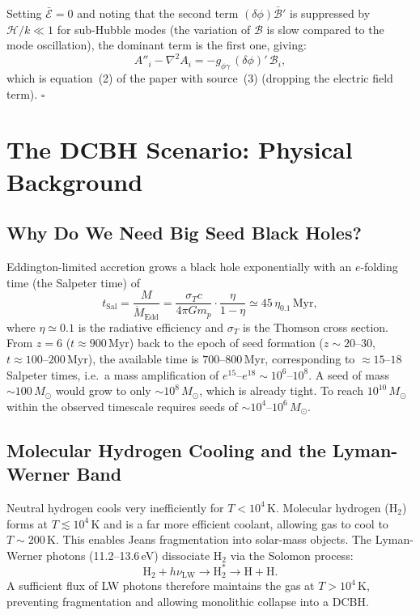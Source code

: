 \documentclass[12pt,a4paper]{report}
\newcommand{\gag}{g_{\phi\gamma}}
\newcommand{\LW}{\mathrm{LW}}
\theoremstyle{definition}
\begin{document}
Setting $\bar{\mathcal{E}}=0$ and noting that the second term
$(\delta\phi)\bar{\mathcal{B}}'$ is suppressed by $\mathcal{H}/k\ll 1$ for
sub-Hubble modes (the variation of $\mathcal{B}$ is slow compared to the mode
oscillation), the dominant term is the first one, giving:
\begin{equation}
  A''_i - \nabla^2 A_i = -\gag\,(\delta\phi)'\,\mathcal{B}_i,
  \label{eq:EOM_final}
\end{equation}
which is equation~(2) of the paper with source~(3) (dropping the electric field term). $\square$

\chapter{The DCBH Scenario: Physical Background}
\label{app:DCBH}

\section{Why Do We Need Big Seed Black Holes?}

Eddington-limited accretion grows a black hole exponentially with an $e$-folding time
(the Salpeter time) of
\begin{equation}
  t_{\mathrm{Sal}} = \frac{M}{\dot M_{\mathrm{Edd}}}
  = \frac{\sigma_T c}{4\pi G m_p}\cdot\frac{\eta}{1-\eta}
  \simeq 45\,\eta_{0.1}\,\mathrm{Myr},
\end{equation}
where $\eta\simeq 0.1$ is the radiative efficiency and $\sigma_T$ is the Thomson
cross section. From $z=6$ ($t\approx 900$\,Myr) back to the epoch of seed formation
($z\sim 20$--$30$, $t\approx 100$--$200$\,Myr), the available time is $700$--$800$\,Myr,
corresponding to $\approx 15$--$18$ Salpeter times, i.e.\ a mass amplification of
$e^{15}$--$e^{18}\sim 10^6$--$10^8$. A seed of mass $\sim 100\,M_\odot$ would grow to
only $\sim 10^8\,M_\odot$, which is already tight. To reach $10^{10}\,M_\odot$
within the observed timescale requires seeds of $\sim 10^4$--$10^6\,M_\odot$.

\section{Molecular Hydrogen Cooling and the Lyman-Werner Band}

Neutral hydrogen cools very inefficiently for $T < 10^4$\,K. Molecular hydrogen
(H$_2$) forms at $T\lesssim 10^4$\,K and is a far more efficient coolant, allowing
gas to cool to $T\sim 200$\,K. This enables Jeans fragmentation into solar-mass
objects. The Lyman-Werner photons (11.2--13.6\,eV) dissociate H$_2$ via the
Solomon process:
\begin{equation}
  \mathrm{H}_2 + h\nu_{\LW} \to \mathrm{H}_2^* \to \mathrm{H} + \mathrm{H}.
\end{equation}
A sufficient flux of LW photons therefore maintains the gas at $T > 10^4$\,K,
preventing fragmentation and allowing monolithic collapse into a DCBH.
\end{document}
